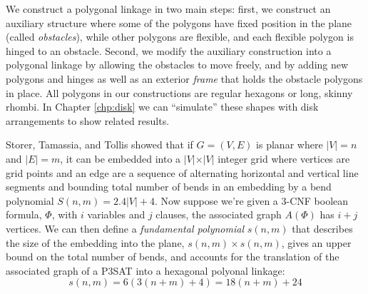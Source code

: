 \documentclass[10pt]{CSUNthesis}
\theoremstyle{plain}%
\theoremstyle{definition}
\theoremstyle{remark}
\newcommand{\lr}[1]{\left( #1 \right)}
\newcommand{\vlr}[1]{\left\vert #1 \right\vert}
\begin{document}
We construct a polygonal linkage in two main steps: first, we construct an auxiliary structure where some of the polygons have fixed position in the plane (called \emph{obstacles}), while other polygons are flexible, and each flexible polygon is hinged to an obstacle. 
Second, we modify the auxiliary construction into a polygonal linkage by allowing the obstacles to move freely, and by adding new polygons and hinges as well as an exterior \emph{frame} that holds the obstacle polygons in place.
All polygons in our constructions are regular hexagons or long, skinny rhombi.
In Chapter \ref{chp:disk} we can ``simulate'' these shapes with disk arrangements to show related results.

Storer, Tamassia, and Tollis \cite{storer1984minimal,tamassia1987efficient} showed that if $G=(V,E)$ is planar where $\vlr{V}=n$ and $\vlr{E} = m$, it can be embedded into a $\vert V \vert \times \vert V \vert$ integer grid where vertices are grid points and an edge are a sequence of alternating horizontal and vertical line segments and bounding total number of bends in an embedding by a bend polynomial $S(n,m)=2.4 \vert V\vert + 4$.  
Now suppose we're given a 3-CNF boolean formula, $\Phi$, with $i$ variables and $j$ clauses, the associated graph $A(\Phi)$ has $i+j$ vertices.  
We can then define a \textit{fundamental polynomial} $s(n,m)$ that describes the size of the embedding into the plane, $s(n,m) \times s(n,m)$, gives an upper bound on the total number of bends, and accounts for the translation of the associated graph of a P3SAT into a hexagonal polyonal linkage:
$$s(n,m) = 6\lr{3 (n+m) + 4} = 18 (n+m) + 24$$
\end{document}
